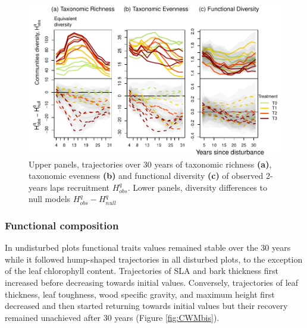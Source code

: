 \documentclass[
  11pt,
  french,
  A4paper,
  extrafontsizes,onecolumn,openright
  ]{memoir}
\begin{document}
\begin{figure}

{\centering \includegraphics[width=1\linewidth]{Manuscript_files/figure-latex/DivTraj-1} 

}

\caption{Upper panels, trajectories over 30 years of taxonomic richness \textbf{(a)}, taxonomic evenness \textbf{(b)} and functional diversity \textbf{(c)} of observed 2-years laps recruitment $H_{obs}^q$. Lower panels, diversity differences to null models $H_{obs}^q - H_{null}^q$}\label{fig:DivTraj}
\end{figure}

\subsubsection{Functional composition}\label{functional-composition}

In undisturbed plots functional traits values remained stable over the
30 years while it followed hump-shaped trajectories in all disturbed
plots, to the exception of the leaf chlorophyll content. Trajectories of
SLA and bark thickness first increased before decreasing towards initial
values. Conversely, trajectories of leaf thickness, leaf toughness, wood
specific gravity, and maximum height first decreased and then started
returning towards initial values but their recovery remained unachieved
after 30 years (Figure \ref{fig:CWMbis}).
\end{document}
